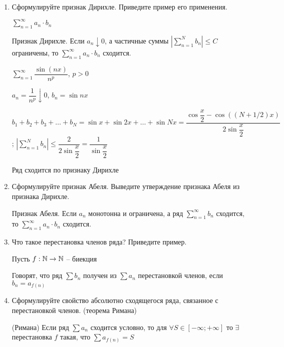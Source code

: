 \documentclass[a4paper]{article}
\begin{document}
\begin{enumerate}
        \item Сформулируйте признак Дирихле. Приведите пример его применения.
        
        $\sum_{n=1}^{\infty}a_n \cdot b_n$

        \begin{theorem}
            Признак Дирихле. Если $a_n \downarrow 0$, а частичные суммы $\left| \sum_{n=1}^N b_n \right| \leq C$ ограничены,
            то $\sum_{n=1}^{\infty}a_n \cdot b_n$ сходится.
        \end{theorem}

        \begin{example}
            $\sum_{n=1}^{\infty} \dfrac{\sin(nx)}{n^p}$, $p > 0$
        
            $a_n = \dfrac{1}{n^p} \downarrow 0$, $b_n = \sin nx$
        
            $b_1 + b_2 + b_3 + \dots + b_N = \sin x+ \sin 2x + \dots + \sin Nx = \dfrac{\cos \dfrac{x}{2} - \cos\left((N + 1/2)x\right)}{2 \sin \dfrac{x}{2}}$; $\left|\sum_{n=1}^{N}b_n\right| \leq \dfrac{2}{2\sin{\dfrac{x}{2}}} = \dfrac{1}{\sin{\dfrac{x}{2}}}$
        
            Ряд сходится по признаку Дирихле
        \end{example}

        \item Сформулируйте признак Абеля. Выведите утверждение признака Абеля из признака Дирихле.
        
        \begin{theorem}
            Признак Абеля. Если $a_n$ монотонна и ограничена, а ряд $\sum_{n=1}^{\infty}b_n$ сходится,
            то $\sum_{n=1}^{\infty}a_n \cdot b_n$ сходится.
        \end{theorem}
        

        \item Что такое перестановка членов ряда? Приведите пример.
        
        Пусть $f: \mathbb{N} \to \mathbb{N}$ -- биекция

        Говорят, что ряд $\sum b_n$ получен из $\sum a_n$ перестановкой членов, если $b_n = a_{f(n)}$

        \item Сформулируйте свойство абсолютно сходящегося ряда, связанное с перестановкой членов. (теорема Римана)
        
        \begin{theorem}
            (Римана) Если ряд $\sum a_n$ сходится условно, то для $\forall S \in [-\infty; +\infty]$ то $\exists$ перестановка $f$ такая, что $\sum a_{f(n)} = S$
        \end{theorem}
    \end{enumerate}
\end{document}
